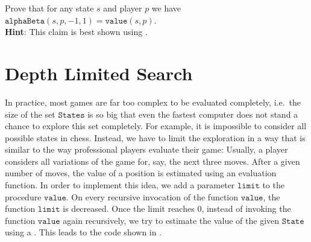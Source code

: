 \exercise
Prove that for any state $s$ and player $p$ we have
\\[0.2cm]
\hspace*{1.3cm}
$\texttt{alphaBeta}(s, p, -1, 1) = \texttt{value}(s, p)$.
\\[0.2cm]
\textbf{Hint}:  This claim is best shown using .
\eox

\section{Depth Limited Search}
In practice, most games are far too complex to be evaluated completely, i.e.~the size of the set
$\texttt{States}$ is so big that even the fastest computer does not stand a chance to explore this set
completely.  For example, it is impossible to consider all possible states in chess.  Instead, we have to limit
the exploration in a way that is similar to the way professional players evaluate their game:  Usually, a
player considers all variations of the game for, say, the next three moves.  After a given number of moves, the
value of a position is estimated using an evaluation function.  In order to implement this idea, we add a
parameter $\texttt{limit}$ to the procedure $\texttt{value}$.  On every recursive invocation 
of the function $\texttt{value}$, the function $\texttt{limit}$ is decreased.  Once the limit reaches $0$,
instead of invoking the function $\texttt{value}$ again recursively, we try to estimate the value of
the given $\texttt{State}$ using a .  This leads to the code shown in .


